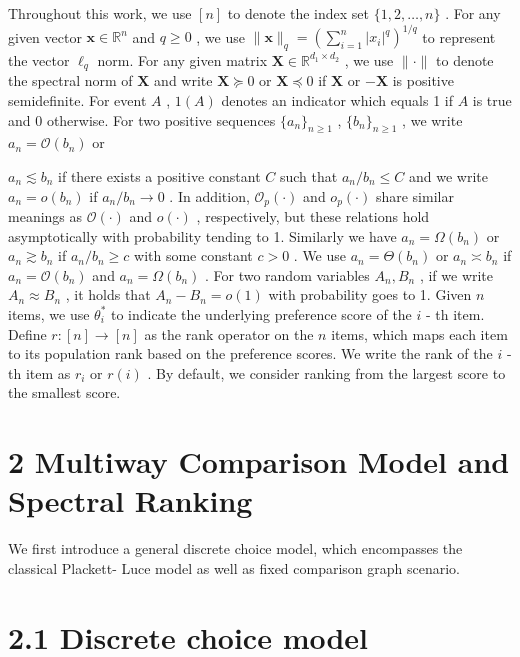 Throughout this work, we use \([n]\) to denote the index set
\(\{1,2,\dots ,n\}\) . For any given vector
\(\mathbf{x} \in \mathbb{R}^n\) and \(q \geq 0\) , we use
\(\| \mathbf{x}\| _q = (\sum_{i = 1}^{n} |x_i|^q)^{1 / q}\) to represent
the vector \(\ell_q\) norm. For any given matrix
\(\mathbf{X} \in \mathbb{R}^{d_1 \times d_2}\) , we use \(\| \cdot \|\)
to denote the spectral norm of \(\mathbf{X}\) and write
\(\mathbf{X} \succcurlyeq 0\) or \(\mathbf{X} \preccurlyeq 0\) if
\(\mathbf{X}\) or \(- \mathbf{X}\) is positive semidefinite. For event
\(A\) , \(1(A)\) denotes an indicator which equals 1 if \(A\) is true
and 0 otherwise. For two positive sequences \(\{a_n\}_{n \geq 1}\) ,
\(\{b_n\}_{n \geq 1}\) , we write \(a_n = \mathcal{O}(b_n)\) or

\(a_{n} \lesssim b_{n}\) if there exists a positive constant \(C\) such
that \(a_{n} / b_{n} \leq C\) and we write \(a_{n} = o(b_{n})\) if
\(a_{n} / b_{n} \to 0\) . In addition, \(\mathcal{O}_{p}(\cdot)\) and
\(o_{p}(\cdot)\) share similar meanings as \(\mathcal{O}(\cdot)\) and
\(o(\cdot)\) , respectively, but these relations hold asymptotically
with probability tending to 1. Similarly we have
\(a_{n} = \Omega (b_{n})\) or \(a_{n} \gtrsim b_{n}\) if
\(a_{n} / b_{n} \geq c\) with some constant \(c > 0\) . We use
\(a_{n} = \Theta (b_{n})\) or \(a_{n} \asymp b_{n}\) if
\(a_{n} = \mathcal{O}(b_{n})\) and \(a_{n} = \Omega (b_{n})\) . For two
random variables \(A_{n}, B_{n}\) , if we write \(A_{n} \approx B_{n}\)
, it holds that \(A_{n} - B_{n} = o(1)\) with probability goes to 1.
Given \(n\) items, we use \(\theta_{i}^{*}\) to indicate the underlying
preference score of the \(i\) - th item. Define \(r: [n] \to [n]\) as
the rank operator on the \(n\) items, which maps each item to its
population rank based on the preference scores. We write the rank of the
\(i\) - th item as \(r_{i}\) or \(r(i)\) . By default, we consider
ranking from the largest score to the smallest score.

\section{2 Multiway Comparison Model and Spectral
Ranking}\label{multiway-comparison-model-and-spectral-ranking}

We first introduce a general discrete choice model, which encompasses
the classical Plackett- Luce model as well as fixed comparison graph
scenario.

\section{2.1 Discrete choice model}\label{discrete-choice-model}

